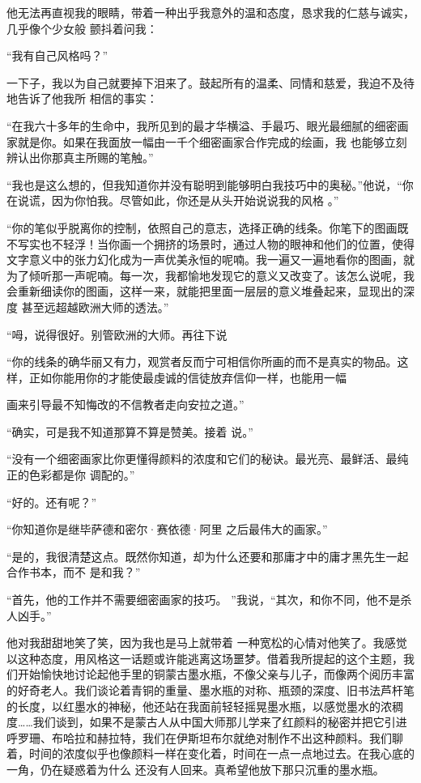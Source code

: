 \documentclass{article}
\begin{document}
他无法再直视我的眼睛，带着一种出乎我意外的温和态度，恳求我的仁慈与诚实，几乎像个少女般
颤抖着问我： 


“我有自己风格吗？” 

一下子，我以为自己就要掉下泪来了。鼓起所有的温柔、同情和慈爱，我迫不及待地告诉了他我所
相信的事实： 

“在我六十多年的生命中，我所见到的最才华横溢、手最巧、眼光最细腻的细密画家就是你。如果在我面放一幅由一千个细密画家合作完成的绘画，我
也能够立刻辨认出你那真主所赐的笔触。” 

\newpage

“我也是这么想的，但我知道你并没有聪明到能够明白我技巧中的奥秘。”他说，“你在说谎，因为你怕我。尽管如此，你还是从头开始说说我的风格
。” 

“你的笔似乎脱离你的控制，依照自己的意志，选择正确的线条。你笔下的图画既不写实也不轻浮！当你画一个拥挤的场景时，通过人物的眼神和他们的位置，使得文字意义中的张力幻化成为一声优美永恒的呢喃。我一遍又一遍地看你的图画，就为了倾听那一声呢喃。每一次，我都愉地发现它的意义又改变了。该怎么说呢，我会重新细读你的图画，这样一来，就能把里面一层层的意义堆叠起来，显现出的深度
甚至远超越欧洲大师的透法。” 

“呣，说得很好。别管欧洲的大师。再往下说

“你的线条的确华丽又有力，观赏者反而宁可相信你所画的而不是真实的物品。这样，正如你能用你的才能使最虔诚的信徒放弃信仰一样，也能用一幅

\newpage
画来引导最不知悔改的不信教者走向安拉之道。” 

“确实，可是我不知道那算不算是赞美。接着
说。” 

“没有一个细密画家比你更懂得颜料的浓度和它们的秘诀。最光亮、最鲜活、最纯正的色彩都是你
调配的。” 


“好的。还有呢？” 

“你知道你是继毕萨德和密尔·赛依德·阿里
之后最伟大的画家。” 

“是的，我很清楚这点。既然你知道，却为什么还要和那庸才中的庸才黑先生一起合作书本，而不
是和我？” 

“首先，他的工作并不需要细密画家的技巧。
”我说，“其次，和你不同，他不是杀人凶手。” 

他对我甜甜地笑了笑，因为我也是马上就带着
\newpage
一种宽松的心情对他笑了。我感觉以这种态度，用风格这一话题或许能逃离这场噩梦。借着我所提起的这个主题，我们开始愉快地讨论起他手里的铜蒙古墨水瓶，不像父亲与儿子，而像两个阅历丰富的好奇老人。我们谈论着青铜的重量、墨水瓶的对称、瓶颈的深度、旧书法芦杆笔的长度，以红墨水的神秘，他还站在我面前轻轻摇晃墨水瓶，以感觉墨水的浓稠度……我们谈到，如果不是蒙古人从中国大师那儿学来了红颜料的秘密并把它引进呼罗珊、布哈拉和赫拉特，我们在伊斯坦布尔就绝对制作不出这种颜料。我们聊着，时间的浓度似乎也像颜料一样在变化着，时间在一点一点地过去。在我心底的一角，仍在疑惑着为什么
还没有人回来。真希望他放下那只沉重的墨水瓶。 
\end{document}
